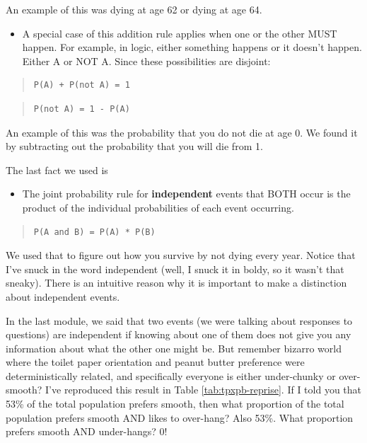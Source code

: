 \documentclass[
  openany]{book}
\providecommand{\tightlist}{%
  \setlength{\itemsep}{0pt}\setlength{\parskip}{0pt}}
\begin{document}
An example of this was dying at age 62 or dying at age 64.

\begin{itemize}
\tightlist
\item
  A special case of this addition rule applies when one or the other MUST happen. For example, in logic, either something happens or it doesn't happen. Either A or NOT A. Since these possibilities are disjoint:
\end{itemize}

\begin{quote}
\begin{verbatim}
P(A) + P(not A) = 1
\end{verbatim}
\end{quote}

\begin{quote}
\begin{verbatim}
P(not A) = 1 - P(A)
\end{verbatim}
\end{quote}

An example of this was the probability that you do not die at age 0. We found it by subtracting out the probability that you will die from 1.

The last fact we used is

\begin{itemize}
\tightlist
\item
  The joint probability rule for \textbf{independent} events that BOTH occur is the product of the individual probabilities of each event occurring.
\end{itemize}

\begin{quote}
\begin{verbatim}
P(A and B) = P(A) * P(B)
\end{verbatim}
\end{quote}

We used that to figure out how you survive by not dying every year. Notice that I've snuck in the word independent (well, I snuck it in boldy, so it wasn't that sneaky). There is an intuitive reason why it is important to make a distinction about independent events.

In the last module, we said that two events (we were talking about responses to questions) are independent if knowing about one of them does not give you any information about what the other one might be. But remember bizarro world where the toilet paper orientation and peanut butter preference were deterministically related, and specifically everyone is either under-chunky or over-smooth? I've reproduced this result in Table \ref{tab:tpxpb-reprise}. If I told you that 53\% of the total population prefers smooth, then what proportion of the total population prefers smooth AND likes to over-hang? Also 53\%. What proportion prefers smooth AND under-hangs? 0!
\end{document}
